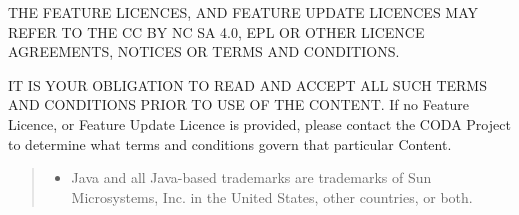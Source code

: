THE FEATURE LICENCES, AND FEATURE UPDATE LICENCES MAY REFER
TO THE CC BY NC SA 4.0, EPL OR OTHER LICENCE AGREEMENTS, NOTICES OR TERMS AND
CONDITIONS.

IT IS YOUR OBLIGATION TO READ AND ACCEPT ALL SUCH TERMS AND
CONDITIONS PRIOR TO USE OF THE CONTENT.  If no Feature
Licence, or Feature Update Licence is provided, please contact the
CODA Project to determine what terms and conditions govern
that particular Content.
\begin{quote}
  \footnotesize

  \begin{itemize}
  \item  Java and all Java-based trademarks are trademarks of Sun
    Microsystems, Inc. in the United States, other countries, or
    both.
  \end{itemize}
\end{quote}


